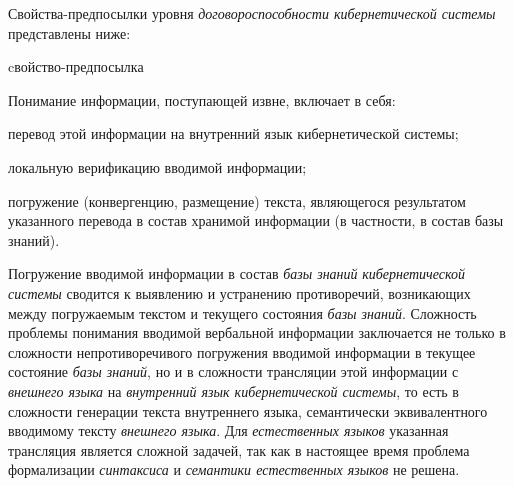 Свойства-предпосылки уровня \textit{договороспособности кибернетической системы} представлены ниже:

\begin{SCn}
\begin{scnrelfromlist}{cвойство-предпосылка}
\end{scnrelfromlist}
\end{SCn}

Понимание информации, поступающей извне, включает в себя:
\begin{textitemize}
    \item перевод этой информации на внутренний язык кибернетической системы;
    \item локальную верификацию вводимой информации;
    \item погружение (конвергенцию, размещение) текста, являющегося результатом указанного перевода в состав хранимой информации (в частности, в состав базы знаний).
\end{textitemize}

Погружение вводимой информации в состав \textit{базы знаний} \textit{кибернетической системы} сводится к выявлению и устранению противоречий, возникающих между погружаемым текстом и текущего состояния \textit{базы знаний}. Сложность проблемы понимания вводимой вербальной информации заключается не только в сложности непротиворечивого погружения вводимой информации в текущее состояние \textit{базы знаний}, но и в сложности трансляции этой информации с \textit{внешнего языка} на \textit{внутренний язык кибернетической системы}, то есть в сложности генерации текста внутреннего языка, семантически эквивалентного вводимому тексту \textit{внешнего языка}.
Для \textit{естественных языков} указанная трансляция является сложной задачей, так как в настоящее время проблема формализации \textit{синтаксиса} и \textit{семантики естественных языков} не решена.

